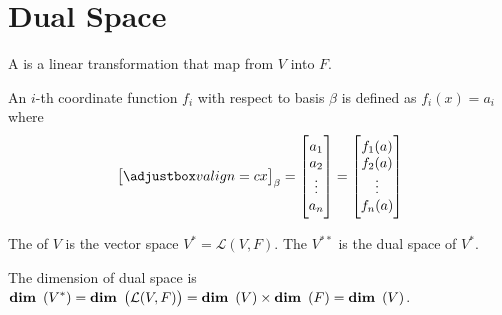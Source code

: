 %
%
%
%

\section{Dual Space}

\begin{definition}
	A  is a linear transformation that map from $V$ into $F$.
\end{definition}

\begin{definition}
	An $i$-th coordinate function $f_i$ with respect to basis $\beta$ is defined as $f_i(x) = a_i$ where
	\begin{equation*}
		\coordinate{x}_\beta = \begin{bmatrix}
			a_1 \\
			a_2 \\
			\vdots \\
			a_n
		\end{bmatrix} = \begin{bmatrix}
			f_1(a) \\
			f_2(a) \\
			\vdots \\
			f_n(a)
		\end{bmatrix}
	\end{equation*}
\end{definition}



\begin{definition}
	The \label{dualspacedefinition} of $V$ is the vector space $V^* = \mathcal{L}(V,F)$. The  $V^{**}$ is the dual space of $V^*$.
\end{definition}


The dimension of dual space is $\displaystyle \mathop{\bf dim\/}~\left( V^* \right) = \displaystyle \mathop{\bf dim\/}~\left( \mathcal{L}(V,F) \right) = \displaystyle \mathop{\bf dim\/}~\left( V \right) \times \displaystyle \mathop{\bf dim\/}~\left( F \right) = \displaystyle \mathop{\bf dim\/}~\left( V \right)$.

